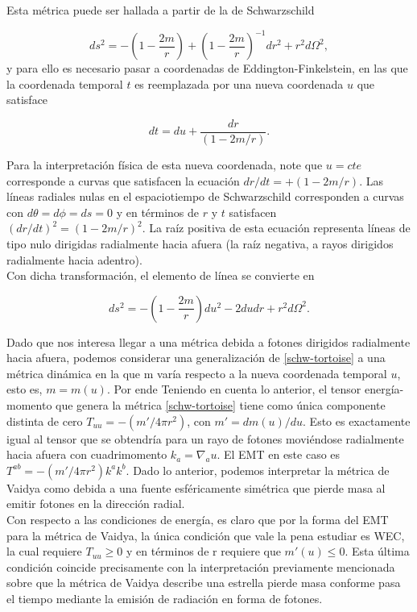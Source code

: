 \documentclass[16pt,a4paper]{article}
\numberwithin{equation}{section}
\theoremstyle{definition}
\begin{document}
Esta métrica puede ser hallada a partir de la de Schwarzschild 

\begin{equation}
ds^2 = -\left( 1 - \frac{2m}{r} \right) + \left( 1 - \frac{2m}{r} \right)^{-1}dr^2 + r^2d\Omega^2,
\end{equation}
y para ello es necesario pasar a coordenadas de Eddington-Finkelstein, en las que la coordenada temporal $t$ es reemplazada por una nueva coordenada $u$ que satisface

\begin{equation}
dt = du + \frac{dr}{(1 - 2m/r)}.
\end{equation}

Para la interpretación física de esta nueva coordenada, note que $u = cte$ corresponde a curvas que satisfacen la ecuación $dr/dt = +\left( 1 -2m/r \right)$. Las líneas radiales nulas en el espaciotiempo de Schwarzschild corresponden a curvas con $d\theta = d\phi = ds = 0$ y en términos de $r$ y $t$ satisfacen $(dr/dt)^2 = \left( 1 -2m/r \right)^2$. La raíz positiva de esta ecuación representa líneas de tipo nulo dirigidas radialmente hacia afuera (la raíz negativa, a rayos dirigidos radialmente hacia adentro).\\

Con dicha transformación, el elemento de línea se convierte en 

\begin{equation}
\label{schw-tortoise}
ds^2 = - \left(1- \frac{2m}{r}\right)du^2 - 2dudr + r^2d\Omega^2.
\end{equation}

Dado que nos interesa llegar a una métrica debida a fotones dirigidos radialmente hacia afuera, podemos considerar una generalización de \eqref{schw-tortoise} a una métrica dinámica en la que m varía respecto a la nueva coordenada temporal $u$, esto es, $m = m(u)$. Por ende Teniendo en cuenta lo anterior, el tensor energía-momento que genera la métrica \eqref{schw-tortoise} tiene como única componente distinta de cero $T_{uu} = -(m'/4 \pi r^2)$, con $m' = dm(u)/du$. Esto es exactamente igual al tensor que se obtendría para un rayo de fotones moviéndose radialmente hacia afuera con cuadrimomento $k_{a} = \nabla_{a}u$. El EMT en este caso es $T^{ab} = -(m'/4 \pi r^2)k^{a}k^{b}$. Dado lo anterior, podemos interpretar la métrica de Vaidya como debida a una fuente esféricamente simétrica que pierde masa al emitir fotones en la dirección radial.\\

Con respecto a las condiciones de energía, es claro que por la forma del EMT para la métrica de Vaidya, la única condición que vale la pena estudiar es WEC, la cual requiere $T_{uu} \geq 0$ y en términos de r requiere que $m'(u)\leq 0 $. Esta última condición coincide precisamente con la interpretación previamente mencionada sobre que la métrica de Vaidya describe una estrella pierde masa conforme pasa el tiempo mediante la emisión de radiación en forma de fotones.\\
\end{document}
